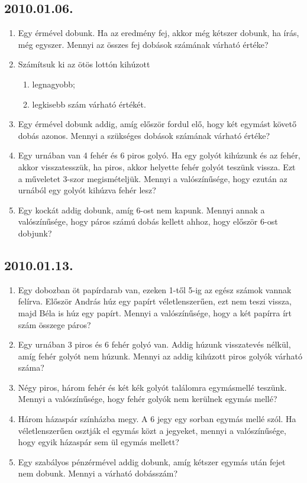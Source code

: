 \documentclass{article}
\newenvironment{abc}{\begin{enumerate}[label=\textit{\alph*})]}{\end{enumerate}}
\begin{document}
\subsection*{2010.01.06.}
\begin{enumerate}
\item Egy érmével dobunk. Ha az eredmény fej, akkor még kétszer dobunk, ha írás, még egyszer. Mennyi az összes fej dobások számának várható értéke?
\item Számítsuk ki az ötös lottón kihúzott
\begin{abc}
\item legnagyobb;
\item legkisebb szám várható értékét.
\end{abc}
\item Egy érmével dobunk addig, amíg először fordul elő, hogy két egymást követő dobás azonos. Mennyi a szükséges dobások számának várható értéke?
\item Egy urnában van 4 fehér és 6 piros golyó. Ha egy golyót kihúzunk és az fehér, akkor visszatesszük, ha piros, akkor helyette fehér golyót teszünk vissza. Ezt a műveletet 3-szor megismételjük. Mennyi a valószínűsége, hogy ezután az urnából egy golyót kihúzva fehér lesz?
\item Egy kockát addig dobunk, amíg 6-ost nem kapunk. Mennyi annak a valószínűsége, hogy páros számú dobás kellett ahhoz, hogy először 6-ost dobjunk?
\end{enumerate}

\subsection*{2010.01.13.}
\begin{enumerate}
\item Egy dobozban öt papírdarab van, ezeken 1-től 5-ig az egész számok vannak felírva. Először András húz egy papírt véletlenszerűen, ezt nem teszi vissza, majd Béla is húz egy papírt. Mennyi a valószínűsége, hogy a két papírra írt szám összege páros?
\item Egy urnában 3 piros és 6 fehér golyó van. Addig húzunk visszatevés nélkül, amíg fehér golyót nem húzunk. Mennyi az addig kihúzott piros golyók várható száma?
\item Négy piros, három fehér és két kék golyót találomra egymásmellé teszünk. Mennyi a valószínűsége, hogy fehér golyók nem kerülnek egymás mellé?
\item Három házaspár színházba megy. A 6 jegy egy sorban egymás mellé szól. Ha véletlenszerűen osztják el egymás közt a jegyeket, mennyi a valószínűsége, hogy egyik házaspár sem ül egymás mellett?
\item Egy szabályos pénzérmével addig dobunk, amíg kétszer egymás után fejet nem dobunk. Mennyi a várható dobásszám?
\end{enumerate}
\end{document}
